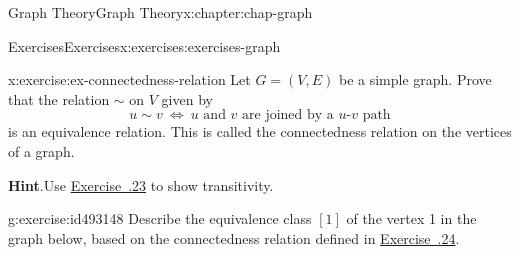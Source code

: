 \documentclass[oneside,10pt,]{book}
\newcommand{\blocktitlefont}{\relax}
\newcommand{\xreffont}{\relax}
\numberwithin{equation}{section}
\begin{document}
\begin{chapterptx}{Graph Theory}{}{Graph Theory}{}{}{x:chapter:chap-graph}
\begin{exercises-section}{Exercises}{}{Exercises}{}{}{x:exercises:exercises-graph}
\begin{divisionexercise}{24}{}{}{x:exercise:ex-connectedness-relation}
Let \(G = (V,E)\) be a simple graph. Prove that the relation \(\sim\) on \(V\) given by%
\begin{equation*}
u \sim v \ \Leftrightarrow \ \text{$u$ and $v$ are joined by a $u$-$v$ path}
\end{equation*}
is an equivalence relation. This is called the connectedness relation on the vertices of a graph.%
\par\smallskip%
\noindent\textbf{\blocktitlefont Hint}.\hypertarget{g:hint:id493180}{}\quad{}Use \hyperlink{x:exercise:ex-path-transitive}{Exercise~{\xreffont 5.8.23}} to show transitivity.%
\end{divisionexercise}%
\begin{divisionexercise}{25}{}{}{g:exercise:id493148}%
Describe the equivalence class \([1]\) of the vertex 1 in the graph below, based on the connectedness relation defined in \hyperlink{x:exercise:ex-connectedness-relation}{Exercise~{\xreffont 5.8.24}}.%
\begin{sidebyside}{1}{0.38}{0.38}{0}%
\begin{sbspanel}{0.24}%
\end{sbspanel}
\end{sidebyside}
\end{divisionexercise}
\end{exercises-section}
\end{chapterptx}
\end{document}
